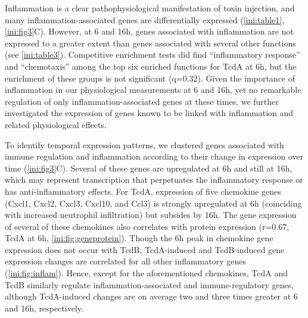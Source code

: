Inflammation is a clear pathophysiological manifestation of toxin 
injection, and many inflammation-associated genes are differentially 
expressed (\autoref{ini:table1}, \autoref{ini:fig3}C). However, at 
6 and 16h, genes associated with inflammation are not expressed to 
a greater extent than genes associated with several other 
functions (see \autoref{ini:table3}). Competitive enrichment 
tests did find ``inflammatory response'' and ``chemotaxis'' among the top 
six enriched functions for TcdA at 6h, but the enrichment of these 
groups is not significant (q=0.32). Given the importance of 
inflammation in our physiological measurements at 6 and 16h, yet no 
remarkable regulation of only inflammation-associated genes at 
these times, we further investigated the expression of genes known 
to be linked with inflammation and related physiological effects.

To identify temporal expression patterns, we clustered genes 
associated with immune regulation and inflammation according to 
their change in expression over time (\autoref{ini:fig3}C). 
Several of these genes are upregulated at 6h and still at 16h, which 
may represent transcription that perpetuates the inflammatory response 
or has anti-inflammatory effects. For TcdA, expression of five 
chemokine genes (Cxcl1, Cxcl2, Cxcl3, Cxcl10, and Ccl3) is strongly 
upregulated at 6h (coinciding with increased neutrophil infiltration) 
but subsides by 16h. The gene expression of several of these chemokines 
also correlates with protein expression (r=0.67, TcdA at 6h, 
\autoref{ini:fig:geneprotein}). Though the 6h peak in chemokine 
gene expression does not occur with TcdB, TcdA-induced and TcdB-induced 
gene expression changes are correlated for all other inflammatory genes 
(\autoref{ini:fig:inflam}). Hence, except for the aforementioned 
chemokines, TcdA and TcdB similarly regulate inflammation-associated 
and immune-regulatory genes, although TcdA-induced changes are on average 
two and three times greater at 6 and 16h, respectively.

